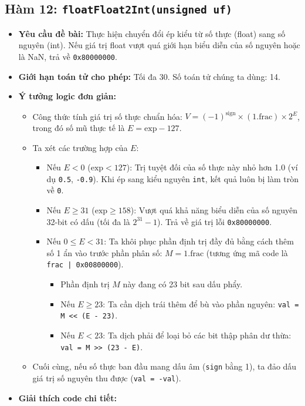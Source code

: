 \documentclass[12pt, a4paper]{article}
\begin{document}
\subsection{Hàm 12: \texttt{floatFloat2Int(unsigned uf)}}
\begin{itemize}
    \item \textbf{Yêu cầu đề bài:} Thực hiện chuyển đổi ép kiểu từ số thực (float) sang số nguyên (int). Nếu giá trị float vượt quá giới hạn biểu diễn của số nguyên hoặc là NaN, trả về \texttt{0x80000000}.
    \item \textbf{Giới hạn toán tử cho phép:} Tối đa 30. Số toán tử chúng ta dùng: 14.
    \item \textbf{Ý tưởng logic đơn giản:}
    \begin{itemize}
        \item Công thức tính giá trị số thực chuẩn hóa: $V = (-1)^{\text{sign}} \times (1.\text{frac}) \times 2^E$, trong đó số mũ thực tế là $E = \text{exp} - 127$.
        \item Ta xét các trường hợp của $E$:
        \begin{itemize}
            \item Nếu $E < 0$ ($\text{exp} < 127$): Trị tuyệt đối của số thực này nhỏ hơn 1.0 (ví dụ \texttt{0.5}, \texttt{-0.9}). Khi ép sang kiểu nguyên \texttt{int}, kết quả luôn bị làm tròn về \texttt{0}.
            \item Nếu $E \ge 31$ ($\text{exp} \ge 158$): Vượt quá khả năng biểu diễn của số nguyên 32-bit có dấu (tối đa là $2^{31}-1$). Trả về giá trị lỗi \texttt{0x80000000}.
            \item Nếu $0 \le E < 31$: Ta khôi phục phần định trị đầy đủ bằng cách thêm số 1 ẩn vào trước phần phân số: $M = 1.\text{frac}$ (tương ứng mã code là \texttt{frac | 0x00800000}).
            \begin{itemize}
                \item Phần định trị $M$ này đang có 23 bit sau dấu phẩy.
                \item Nếu $E \ge 23$: Ta cần dịch trái thêm để bù vào phần nguyên: \texttt{val = M << (E - 23)}.
                \item Nếu $E < 23$: Ta dịch phải để loại bỏ các bit thập phân dư thừa: \texttt{val = M >> (23 - E)}.
            \end{itemize}
        \end{itemize}
        \item Cuối cùng, nếu số thực ban đầu mang dấu âm (\texttt{sign} bằng 1), ta đảo dấu giá trị số nguyên thu được (\texttt{val = -val}).
    \end{itemize}
    \item \textbf{Giải thích code chi tiết:}



\end{itemize}
\end{document}
